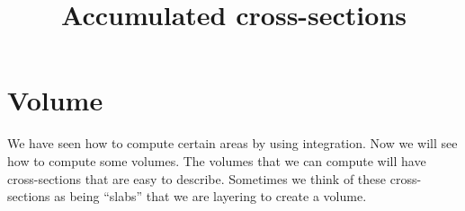 \documentclass{ximera}
\title[Dig-In:]{Accumulated cross-sections}
\begin{document}
\begin{abstract}
\end{abstract}
\maketitle

\section{Volume}

We have seen how to compute certain areas by using integration. Now we
will see how to compute some volumes.  The volumes that we can compute
will have cross-sections that are easy to describe. Sometimes we think
of these cross-sections as being ``slabs'' that we are layering to
create a volume.
\end{document}
